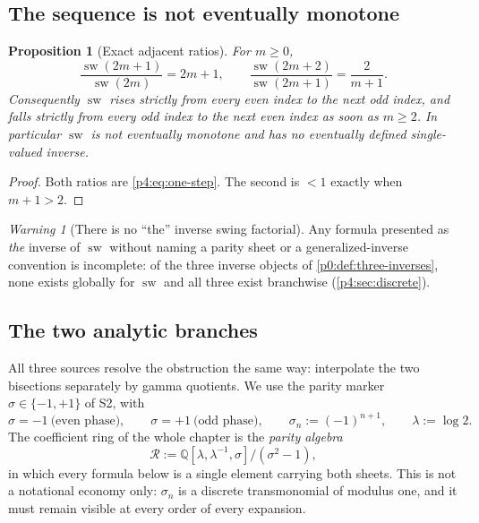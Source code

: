 \documentclass[11pt,a4paper,oneside]{book}
\theoremstyle{plain}
\newtheorem{proposition}[theorem]{Proposition}
\theoremstyle{definition}
\theoremstyle{remark}
\newtheorem{warning}[theorem]{Warning}
\newcommand{\Rat}{\mathbb{Q}}
\begin{document}
\subsection{The sequence is not eventually monotone}

\begin{proposition}[Exact adjacent ratios]
\label{p4:prop:ratios}
For $m\ge0$,
\begin{equation}
  \frac{\operatorname{sw}(2m+1)}{\operatorname{sw}(2m)}=2m+1,
  \qquad
  \frac{\operatorname{sw}(2m+2)}{\operatorname{sw}(2m+1)}=\frac{2}{m+1}.
  \label{p4:eq:ratios}
\end{equation}
Consequently $\operatorname{sw}$ rises strictly from every even index to the
next odd index, and falls strictly from every odd index to the next even index
as soon as $m\ge2$.  In particular $\operatorname{sw}$ is not eventually
monotone and has no eventually defined single-valued inverse.
\end{proposition}

\begin{proof}
Both ratios are \cref{p4:eq:one-step}.  The second is $<1$ exactly when
$m+1>2$.
\end{proof}

\begin{warning}[There is no ``the'' inverse swing factorial]
\label{p4:rem:two-sheets}
Any formula presented as \emph{the} inverse of $\operatorname{sw}$ without
naming a parity sheet or a generalized-inverse convention is incomplete: of
the three inverse objects of \cref{p0:def:three-inverses}, none exists
globally for $\operatorname{sw}$ and all three exist branchwise
(\cref{p4:sec:discrete}).
\end{warning}

\subsection{The two analytic branches}

All three sources resolve the obstruction the same way: interpolate the two
bisections separately by gamma quotients.  We use the parity marker
$\sigma\in\{-1,+1\}$ of \textsf{S2}, with
\begin{equation}
  \sigma=-1 \ \text{(even phase)},
  \qquad
  \sigma=+1 \ \text{(odd phase)},
  \qquad
  \sigma_n:=(-1)^{n+1},
  \qquad
  \lambda:=\log2 .
  \label{p4:eq:parity-marker}
\end{equation}
The coefficient ring of the whole chapter is the \emph{parity algebra}
\begin{equation}
  \mathscr R:=\Rat[\lambda,\lambda^{-1},\sigma]\big/(\sigma^2-1),
  \label{p4:eq:parity-algebra}
\end{equation}
in which every formula below is a single element carrying both sheets.  This
is not a notational economy only: $\sigma_n$ is a discrete transmonomial of
modulus one, and it must remain visible at every order of every expansion.
\end{document}
